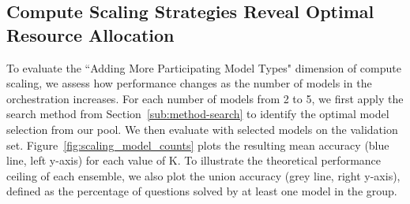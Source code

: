 \vspace{3pt}
\subsection{Compute Scaling Strategies Reveal Optimal Resource Allocation}
\vspace{3pt}

\label{sub:scaling-results}

To evaluate the ``Adding More Participating Model Types" dimension of compute scaling, we assess how performance changes as the number of models in the orchestration increases. For each number of models from 2 to 5, we first apply the search method from Section~\ref{sub:method-search} to identify the optimal model selection from our pool. We then evaluate \NAME{} with selected models on the validation set. Figure~\ref{fig:scaling_model_counts} plots the resulting mean accuracy (blue line, left y-axis) for each value of K. To illustrate the theoretical performance ceiling of each ensemble, we also plot the union accuracy (grey line, right y-axis), defined as the percentage of questions solved by at least one model in the group.


\begin{table}[h]
\centering
\setlength{\tabcolsep}{20pt}
\renewcommand{\arraystretch}{0.9}
\vspace{-5pt}
\caption{\textbf{Comparison of \NAME{} and Agent Forest.} We compare \NAME{} and Agent Forest in two settings: \textbf{(1)} with 2 samples per model (Samples=2), and \textbf{(2)} using the best accuracy found during scaling for each method (Samples=best). In the second setting, the number of samples per model may vary. }
\label{tab:SLM-Mux_vs_af_comparison}
\end{table}


